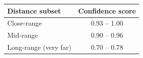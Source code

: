 \documentclass[border=10pt]{standalone}
\begin{document}
\begin{tabular}{lc}
\toprule
\textbf{Distance subset} & \textbf{Confidence score} \\
\midrule
Close-range               & 0.93 -- 1.00 \\
Mid-range                 & 0.90 -- 0.96 \\
Long-range (very far)     & 0.70 -- 0.78 \\
\bottomrule
\end{tabular}
\end{document}
